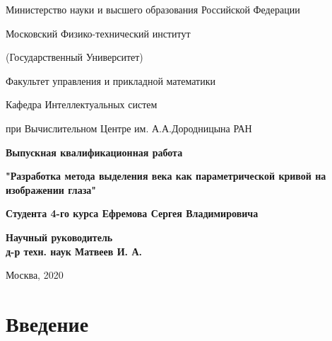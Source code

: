 \documentclass[12pt]{article} %
\begin{document}
	
\vskip 3mm

\setcounter{page}{1}
\begin{center}
	\thispagestyle{empty}
	
	{ Министерство науки и высшего образования Российской Федерации\\}

	
	
	{ Московский Физико-технический институт \\}
	
	{ (Государственный Университет) \\}
	
	{ Факультет управления и прикладной математики  \\}
	
	{ Кафедра Интеллектуальных систем\\}
	
	{при Вычислительном Центре им. А.А.Дородницына РАН\\ [4cm]}
	
	{ \bf \Large Выпускная квалификационная работа\\}
	
	{ \bf \Large{"Разработка метода выделения века как параметрической кривой на изображении глаза"\\[1cm]} }
	
	{\bf {Студента 4-го курса Ефремова Сергея Владимировича}\\[3cm]}
	
\end{center}

\begin{flushright}
	\bf{Научный руководитель}\\
	\bf{д-р техн. наук Матвеев И. А.}\\[4cm]
\end{flushright}


\begin{center}
	Москва, 2020
\end{center}

\newpage
\begin{abstract}
	{}
	

\end{abstract}

\newpage
\tableofcontents
 


\newpage
\section{Введение}
\end{document}
